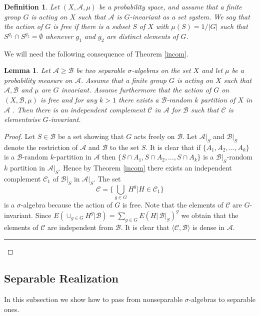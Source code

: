 \documentclass [11pt] {article}
\newcommand{\qed} {\hspace {0.1in} \rule {1.5mm} {3.5mm}}
\newtheorem{lemma}{Lemma}[section]
\newtheorem{definition}{Definition}[section]
\begin{document}
\begin{definition} Let $(X,\mathcal{A},\mu)$ be a probability space, and
  assume that a finite group $G$ is acting on $X$ such that $\mathcal{A}$ is
  $G$-invariant as a set system. We say that the action of $G$ is free if
  there is a subset $S$ of $X$ with $\mu(S)=1/|G|$ such that $S^{g_1}\cap
  S^{g_2}=\emptyset$ whenever $g_1$ and $g_2$ are distinct elements of $G$.
\end{definition}

We will need the following consequence of Theorem \ref{incom}.

\begin{lemma}\label{incom2} Let $\mathcal{A}\geq\mathcal{B}$ be two separable
  $\sigma$-algebras on the set $X$ and let $\mu$ be a probability measure on
  $\mathcal{A}$. Assume that a finite group $G$ is acting on $X$ such that
  $\mathcal{A},\mathcal{B}$ and $\mu$ are $G$ invariant. Assume furthermore
  that the action of $G$ on $(X,\mathcal{B},\mu)$ is free and for any $k>1$
  there exists a
  $\mathcal{B}$-random $k$ partition of $X$ in $\mathcal{A}$
. Then there is an independent complement $\mathcal{C}$ in
  $\mathcal{A}$ for $\mathcal{B}$ such that $\mathcal{C}$ is
  elementwise $G$-invariant.
\end{lemma}

\begin{proof} Let $S\in\mathcal{B}$ be a set showing that $G$ acts freely
  on $\mathcal{B}$. Let $\mathcal{A}|_S$ and
  $\mathcal{B}|_S$ denote the restriction of $\mathcal{A}$ and
  $\mathcal{B}$ to the set $S$. It is clear that if
  $\{A_1,A_2,\dots,A_k\}$ is a $\mathcal{B}$-random $k$-partition in
  $\mathcal{A}$ then $\{S\cap A_1,S\cap A_2,\dots,S\cap A_k\}$ is a
  $\mathcal{B}|_S$-random $k$ partition in $\mathcal{A}|_S$. Hence by
  Theorem \ref{incom} there exists an independent complement $\mathcal{C}_1$ of
  $\mathcal{B}|_S$ in $\mathcal{A}|_S$. The set
$$\mathcal{C}=\{\bigcup_{g\in G} H^g|H\in\mathcal{C}_1\}$$ is a
$\sigma$-algebra because the action of $G$ is free. Note that the
elements of $\mathcal{C}$ are $G$-invariant. Since $E(\cup_{g\in G}
H^g|\mathcal{B})=\sum_{g\in G} E(H|\,\mathcal{B}|_S)^g$ we obtain that
the elements of $\mathcal{C}$ are independent from $\mathcal{B}$. It
is clear that $\langle\mathcal{C},\mathcal{B}\rangle$ is dense in
$\mathcal{A}$. \qed
\end{proof}


\subsection{Separable Realization}\label{sepreal}
In this subsection we show how to pass from nonseparable $\sigma$-algebras to
separable ones.
\end{document}
